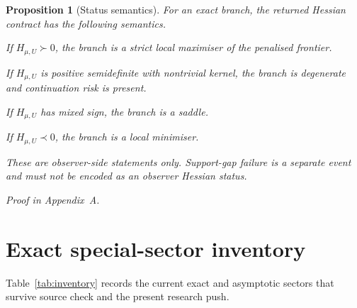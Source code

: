 \documentclass[11pt,a4paper]{article}
\numberwithin{equation}{section}
\theoremstyle{thmcompact}
\newtheorem{proposition}[theorem]{Proposition}
\theoremstyle{remark}
\newcommand{\proofappendix}{\par{\hfill\scriptsize\emph{Proof in Appendix~A.}}\par}
\begin{document}
\begin{proposition}[Status semantics]
\label{prop:branch-hessian-status}
For an exact branch, the returned Hessian contract has the following semantics.

If $H_{\mu,U}\succ 0$, the branch is a strict local maximiser of the penalised frontier.

If $H_{\mu,U}$ is positive semidefinite with nontrivial kernel, the branch is degenerate and continuation risk is present.

If $H_{\mu,U}$ has mixed sign, the branch is a saddle.

If $H_{\mu,U}\prec 0$, the branch is a local minimiser.

These are observer-side statements only. Support-gap failure is a separate event and must not be encoded as an observer Hessian status.
\end{proposition}

\proofappendix

\section{Exact special-sector inventory}

Table~\ref{tab:inventory} records the current exact and asymptotic sectors that survive source check and the present research push.
\end{document}
